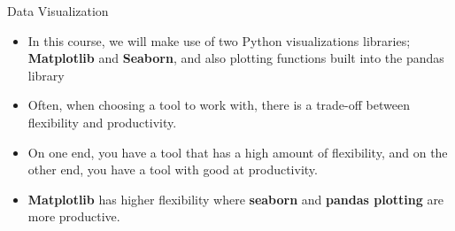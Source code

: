 \documentclass[12pt]{beamer}
\begin{document}
    \begin{frame}{Data Visualization}
    	\begin{itemize}
    		\item In this course, we will make use of two Python visualizations libraries; \textbf{Matplotlib} and \textbf{Seaborn}, and also plotting functions built into the pandas library
    		\item Often, when choosing a tool to work with, there is a trade-off between flexibility and productivity. 
    		\item On one end, you have a tool that has a high amount of flexibility, and on the other end, you have a tool with good at productivity.
    		\item \textbf{Matplotlib} has higher flexibility where \textbf{seaborn} and \textbf{pandas plotting} are more productive.
    	\end{itemize}
    \end{frame}
\end{document}
